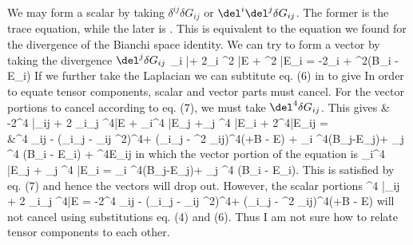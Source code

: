 \documentclass[10pt,letterpaper]{article}
\begin{document}
\ea
We may form a scalar by taking $\delta^{ij}\delta G_{ij}$ or $\del^i\del^j \delta G_{ij}$. The former is the trace equation, while the later is
\be
	.
\ee
This is equivalent to the equation we found for the divergence of the Bianchi space identity. We can try to form a vector by taking the divergence $\del^j\delta G_{ij}$
\del_i \bar \psi + 2\del_i \del^2 \bar E + \del^2 \bar E_i = -2\ddot \del_i \psi+ \del^2(\dot B_i - \ddot E_i)
\ee
If we further take the Laplacian we can subtitute eq. (6) in to give
\be
\ee
In order to equate tensor components, scalar and vector parts must cancel. For the vector portions to cancel according to eq. (7), we must take $\del^4 \delta G_{ij}$. This gives
\ba
	& -2\del^4 \bar \psi \delta_{ij} + 2 \del_i\del_j \del^4\bar E + \del_i\del^4 \bar E_j +\del_j \del^4 \bar E_i + 2\del^4\bar E_{ij} =\\
	&\del^4 \ddot \psi \delta_{ij} - (\del_i\del_j - \delta_{ij} \del^2)\del^4\psi + (\del_i\del_j - \del^2 \delta_{ij})\del^4(\phi+\dot B - \ddot E) +  \del_i \del^4(\dot B_j-\ddot E_j)+ \del_j \del^4 (\dot B_i - \ddot E_i) + \del^4\Box E_{ij}
\ea
in which the vector portion of the equation is 
\be
	\del_i\del^4 \bar E_j + \del_j \del^4 \bar E_i =   \del_i \del^4(\dot B_j-\ddot E_j)+ \del_j \del^4 (\dot B_i - \ddot E_i).
\ee
This is satisfied by eq. (7) and hence the vectors will drop out. 
However, the scalar portions 
\del^4 \bar \psi \delta_{ij} + 2 \del_i\del_j \del^4\bar E = -2\del^4 \ddot \psi \delta_{ij} - (\del_i\del_j - \delta_{ij} \del^2)\del^4\psi + (\del_i\del_j - \del^2 \delta_{ij})\del^4(\phi+\dot B - \ddot E)
\ee
will not cancel using substitutions eq. (4) and (6). Thus I am not sure how to relate tensor components to each other. 
\end{document}
